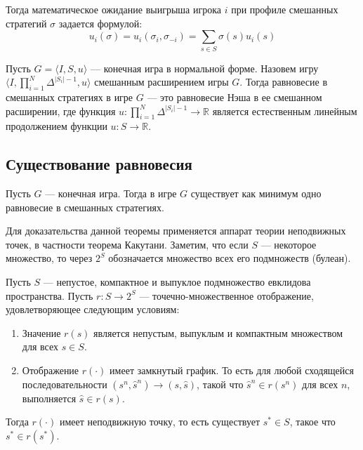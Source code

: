 Тогда математическое ожидание выигрыша игрока $i$ при профиле смешанных стратегий $\sigma$ задается формулой:
\begin{equation}
    u_i(\sigma) = u_i(\sigma_i, \sigma_{-i}) = \sum_{s \in S} \sigma(s)u_i(s)
\end{equation}

\begin{definition}
Пусть $G = \langle I, S, u \rangle$ — конечная игра в нормальной форме. Назовем игру $\langle I, \prod_{i=1}^N \Delta^{|S_i|-1}, u \rangle$ смешанным расширением игры $G$. Тогда равновесие в смешанных стратегиях в игре $G$ — это равновесие Нэша в ее смешанном расширении, где функция $u \colon \prod_{i=1}^N \Delta^{|S_i|-1} \to \mathbb{R}$ является естественным линейным продолжением функции $u \colon S \to \mathbb{R}$.
\end{definition}

\subsection{Существование равновесия}

\begin{theorem}[Дж. Нэш, 1950]\label{thm:nash_existence}
Пусть $G$ — конечная игра. Тогда в игре $G$ существует как минимум одно равновесие в смешанных стратегиях.
\end{theorem}

Для доказательства данной теоремы применяется аппарат теории неподвижных точек, в частности теорема Какутани. Заметим, что если $S$ — некоторое множество, то через $2^S$ обозначается множество всех его подмножеств (булеан).

\begin{theorem}[Какутани, 1941]
Пусть $S$ — непустое, компактное и выпуклое подмножество евклидова пространства. Пусть $r \colon S \to 2^S$ — точечно-множественное отображение, удовлетворяющее следующим условиям:
\begin{enumerate}
    \item Значение $r(s)$ является непустым, выпуклым и компактным множеством для всех $s \in S$.
    \item Отображение $r(\cdot)$ имеет замкнутый график. То есть для любой сходящейся последовательности $(s^n, \hat{s}^n) \to (s, \hat{s})$, такой что $\hat{s}^n \in r(s^n)$ для всех $n$, выполняется $\hat{s} \in r(s)$.
\end{enumerate}
Тогда $r(\cdot)$ имеет неподвижную точку, то есть существует $s^* \in S$, такое что $s^* \in r(s^*)$.
\end{theorem}

